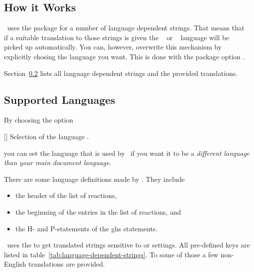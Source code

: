 \documentclass[load-preamble+]{cnltx-doc}
\begin{document}
\subsection{How it Works}
\chemmacros\ uses the  package for a number of language
dependent strings.  That means that if a suitable translation to those strings
is given the ~\cite{pkg:babel} or
~\cite{pkg:polyglossia} language will be picked up
automatically.  You can, however, overwrite this mechanism by explicitly
chosing the language you want.  This is done with the package option
.

Section~\ref{sec:supported-languages} lists all language dependent strings and
the provided translations.

\subsection{Supported Languages}\label{sec:supported-languages}
By choosing the option
\begin{commands}
  []
    Selection of the language .
\end{commands}
you can set the language that is used by \chemmacros\ if you want it to be a
\emph{different language than your main document language}.

There are some language definitions made by \chemmacros.  They include
\begin{itemize}
  \item the header of the list of reactions,
  \item the beginning of the entries in the list of reactions, and
  \item the H- and P-statements of the \ac{ghs} statements.
\end{itemize}

\chemmacros\ uses the  to get translated strings sensitive
to  or  settings.  All pre-defined
 keys are listed in
table~\ref{tab:language-dependent-strings}.  To some of those a few
non-English translations are provided.
\end{document}
